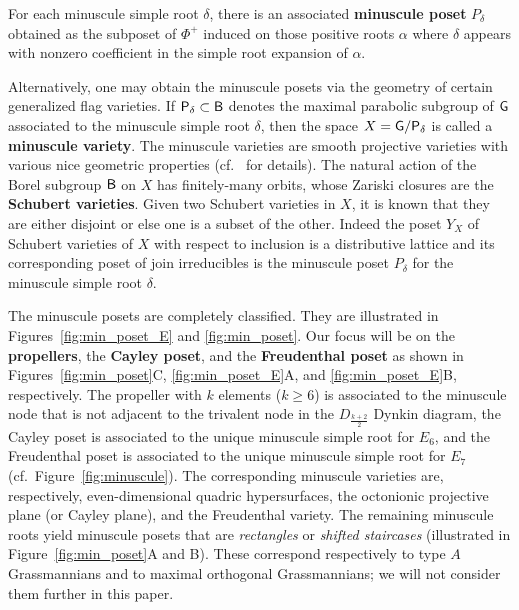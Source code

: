 \documentclass[12pt]{amsart}
\theoremstyle{definition}
\theoremstyle{remark}
\numberwithin{equation}{section}
\begin{document}
For each minuscule simple root $\delta$, there is an associated {\bf minuscule poset} $P_\delta$ obtained as the subposet of $\Phi^+$ induced on those positive roots $\alpha$ where $\delta$ appears with nonzero coefficient in the simple root expansion of $\alpha$. 

Alternatively, one may obtain the minuscule posets via the geometry of certain generalized flag varieties. If ${\sf P}_\delta \subset {\sf B}$ denotes the maximal parabolic subgroup of ${\sf G}$ associated to the minuscule simple root $\delta$, then the space $X = {\sf G} / {\sf P}_\delta$ is called a {\bf minuscule variety}. The minuscule varieties are smooth projective varieties with various nice geometric properties (cf.~\cite{Billey.Lakshmibai} for details). The natural action of the Borel subgroup ${\sf B}$ on $X$ has finitely-many orbits, whose Zariski closures are the {\bf Schubert varieties}. Given two Schubert varieties in $X$, it is known that they are either disjoint or else one is a subset of the other. Indeed the poset $Y_X$ of Schubert varieties of $X$ with respect to inclusion is a distributive lattice and its corresponding poset of join irreducibles is the minuscule poset $P_\delta$ for the minuscule simple root $\delta$.

The minuscule posets are completely classified. They are illustrated in Figures~\ref{fig:min_poset_E} and \ref{fig:min_poset}. Our focus will be on the {\bf propellers}, the {\bf Cayley poset}, and the {\bf Freudenthal poset} as shown in Figures~\ref{fig:min_poset}C, \ref{fig:min_poset_E}A, and \ref{fig:min_poset_E}B, respectively. The propeller with $k$ elements ($k \geq 6$) is associated to the minuscule node that is not adjacent to the trivalent node in the $D_{\frac{k+2}{2}}$ Dynkin diagram, the Cayley poset is associated to the unique minuscule simple root for $E_6$, and the Freudenthal poset is associated to the unique minuscule simple root for $E_7$ (cf.\ Figure~\ref{fig:minuscule}). The corresponding minuscule varieties are, respectively, even-dimensional quadric hypersurfaces, the octonionic projective plane (or Cayley plane), and the Freudenthal variety. The remaining minuscule roots yield minuscule posets that are \emph{rectangles} or \emph{shifted staircases} (illustrated in Figure~\ref{fig:min_poset}A and B). These correspond respectively to type $A$ Grassmannians and to maximal orthogonal Grassmannians; we will not consider them further in this paper.
\end{document}
